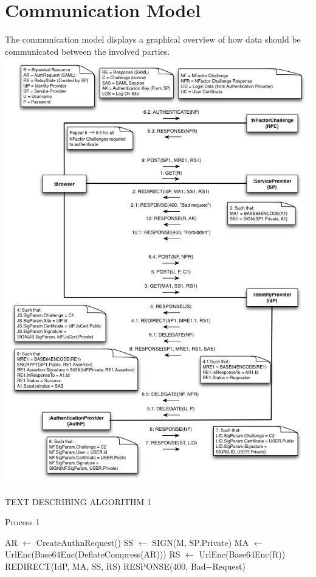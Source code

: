 \documentclass[twosided]{report}
\begin{document}
\section{Communication Model}
The communication model displays a graphical overview of how data should be communicated between the involved parties.
\newpage
\includegraphics[scale=0.6]{images/Communication.png}

TEXT DESCRIBING ALGORITHM 1
\begin{algorithm}[H]
	\caption{Process 1}
	\begin{algorithmic}
		\STATE AR $\leftarrow$ CreateAuthnRequest()
		\STATE SS $\leftarrow$ SIGN(M, SP.Private)
		\STATE MA $\leftarrow$ UrlEnc(Base64Enc(DeflateCompress(AR)))
		\STATE RS $\leftarrow$ UrlEnc(Base64Enc(R))
		\RETURN REDIRECT(IdP, MA, SS, RS)
	\ELSE
		\RETURN RESPONSE(400, Bad−Request)
	\ENDIF
	\end{algorithmic}
\end{algorithm}
\end{document}
